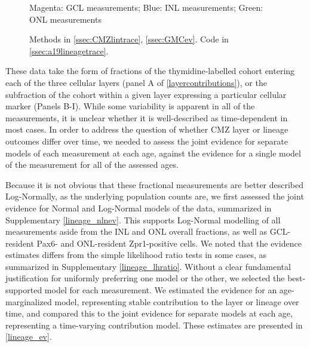\documentclass{ut-thesis}
\begin{document}
\begin{NoHyper}
\begin{figure}[!h]
    Magenta: GCL measurements; Blue: INL measurements; Green: ONL measurements

    Methods in \autoref{ssec:CMZlintrace}, \autoref{ssec:GMCev}.
    Code in \autoref{ssec:a19lineagetrace}.    
    \label{layercontributions}
\end{figure}

These data take the form of fractions of the thymidine-labelled cohort entering each of the three cellular layers (panel A of \autoref{layercontributions}), or the subfraction of the cohort within a given layer expressing a particular cellular marker (Panels B-I). While some variability is apparent in all of the measurements, it is unclear whether it is well-described as time-dependent in most cases. In order to address the question of whether CMZ layer or lineage outcomes differ over time, we needed to assess the joint evidence for separate models of each measurement at each age, against the evidence for a single model of the measurement for all of the assessed ages. 

Because it is not obvious that these fractional measurements are better described Log-Normally, as the underlying population counts are, we first assessed the joint evidence for Normal and Log-Normal models of the data, summarized in Supplementary \autoref{lineage_nlnev}. This supports Log-Normal modelling of all measurements aside from the INL and ONL overall fractions, as well as GCL-resident Pax6- and ONL-resident Zpr1-positive cells. We noted that the evidence estimates differs from the simple likelihood ratio tests in some cases, as summarized in Supplementary \autoref{lineage_lhratio}.  Without a clear fundamental justification for uniformly preferring one model or the other, we selected the best-supported model for each measurement. We estimated the evidence for an age-marginalized model, representing stable contribution to the layer or lineage over time, and compared this to the joint evidence for separate models at each age, representing a time-varying contribution model. These estimates are presented in \autoref{lineage_ev}.


\end{NoHyper}
\end{document}
